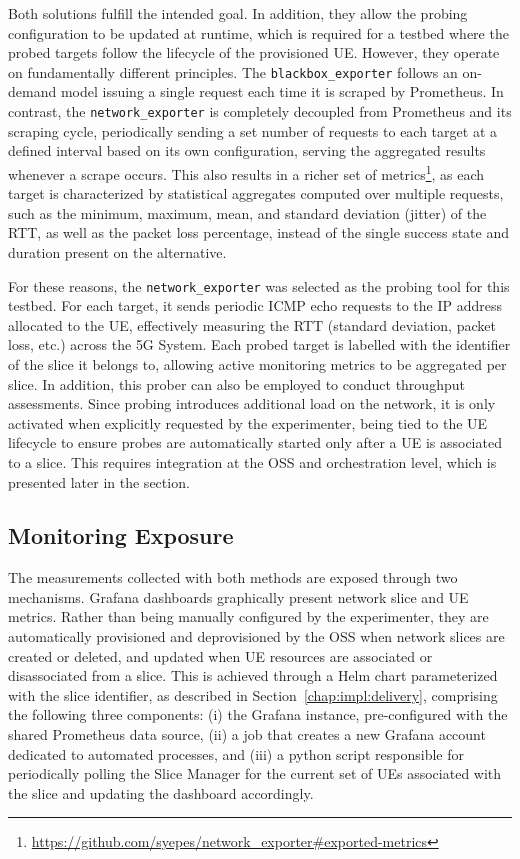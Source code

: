 Both solutions fulfill the intended goal. In addition, they allow the probing configuration to be updated at runtime, which is required for a testbed where the probed targets follow the lifecycle of the provisioned \acs{UE}. However, they operate on fundamentally different principles. The \texttt{blackbox\_exporter} follows an on-demand model issuing a single request each time it is scraped by Prometheus. In contrast, the \texttt{network\_exporter} is completely decoupled from Prometheus and its scraping cycle, periodically sending a set number of requests to each target at a defined interval based on its own configuration, serving the aggregated results whenever a scrape occurs. This also results in a richer set of metrics\footnote{\url{https://github.com/syepes/network_exporter\#exported-metrics}}, as each target is characterized by statistical aggregates computed over multiple requests, such as the minimum, maximum, mean, and standard deviation (jitter) of the \acs{RTT}, as well as the packet loss percentage, instead of the single success state and duration present on the alternative.

For these reasons, the \texttt{network\_exporter} was selected as the probing tool for this testbed. For each target, it sends periodic \acs{ICMP} echo requests to the \acs{IP} address allocated to the \acs{UE}, effectively measuring the \acs{RTT} (standard deviation, packet loss, etc.) across the \acs{5G} System. Each probed target is labelled with the identifier of the slice it belongs to, allowing active monitoring metrics to be aggregated per slice. In addition, this prober can also be employed to conduct throughput assessments. Since probing introduces additional load on the network, it is only activated when explicitly requested by the experimenter, being tied to the \acs{UE} lifecycle to ensure probes are automatically started only after a \acs{UE} is associated to a slice. This requires integration at the \acs{OSS} and orchestration level, which is presented later in the section.

\subsection{Monitoring Exposure}
\label{chap:impl:observability:exposure}

The measurements collected with both methods are exposed through two mechanisms. Grafana dashboards graphically present network slice and \acs{UE} metrics. Rather than being manually configured by the experimenter, they are automatically provisioned and deprovisioned by the \acs{OSS} when network slices are created or deleted, and updated when \acs{UE} resources are associated or disassociated from a slice. This is achieved through a Helm chart parameterized with the slice identifier, as described in Section~\ref{chap:impl:delivery}, comprising the following three components: (i) the Grafana instance, pre-configured with the shared Prometheus data source, (ii) a job that creates a new Grafana account dedicated to automated processes, and (iii) a python script responsible for periodically polling the Slice Manager for the current set of \acsp{UE} associated with the slice and updating the dashboard accordingly.

